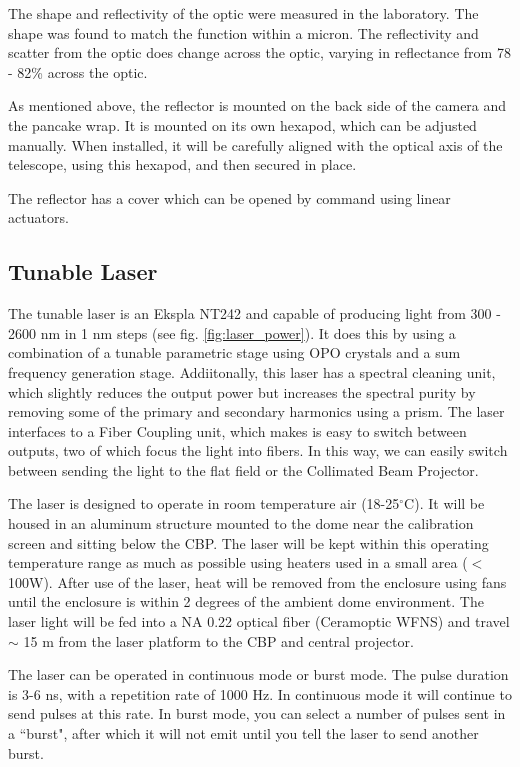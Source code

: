 \documentclass[SE,authoryear,lsstdraft,toc]{lsstdoc}
\begin{document}
The shape and reflectivity of the optic were measured in the laboratory. The shape was found to match the function within a micron. The reflectivity and scatter from the optic does change across the optic, varying in reflectance from 78 - 82\% across the optic.

As mentioned above, the reflector is mounted on the back side of the camera and the pancake wrap. It is mounted on its own hexapod, which can be adjusted manually. When installed, it will be carefully aligned with the optical axis of the telescope, using this hexapod, and then secured in place.

The reflector has a cover which can be opened by command using linear actuators. 

\subsection{Tunable Laser}
The tunable laser is an Ekspla NT242 and capable of producing light from 300 - 2600 nm in 1 nm steps (see fig. \ref{fig:laser_power}). It does this by using a combination of a tunable parametric stage using OPO crystals and a sum frequency generation stage. 
Addiitonally, this laser has a spectral cleaning unit, which slightly reduces the output power but increases the spectral purity by removing some of the primary and secondary harmonics using a prism. The laser interfaces to a Fiber Coupling unit, which makes is easy to switch between outputs, two of which focus the light into fibers. 
In this way, we can easily switch between sending the light to the flat field or the Collimated Beam Projector. 

The laser is designed to operate in room temperature air (18-25$^{\circ}$C). 
It will be housed in an aluminum structure mounted to the dome near the calibration screen and sitting below the CBP. 
The laser will be kept within this operating temperature range as much as possible using heaters used in a small area ($<$100W). After use of the laser, heat will be removed from the enclosure using fans until the enclosure is within 2 degrees of the ambient dome environment.
The laser light will be fed into a NA 0.22 optical fiber (Ceramoptic WFNS) and travel $\sim$ 15 m from the laser platform to the CBP and central projector. 

The laser can be operated in continuous mode or burst mode. 
The pulse duration is 3-6 ns, with a repetition rate of 1000 Hz. 
In continuous mode it will continue to send pulses at this rate. 
In burst mode, you can select a number of pulses sent in a ``burst", after which it will not emit until you tell the laser to send another burst.
\end{document}

